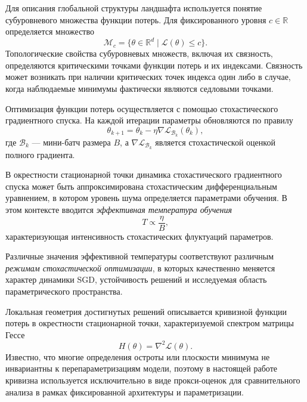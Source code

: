 Для описания глобальной структуры ландшафта используется понятие субуровневого множества функции потерь. 
Для фиксированного уровня $c \in \mathbb{R}$ определяется множество
\begin{equation}
\mathcal{M}_c = \{\theta \in \mathbb{R}^d \mid \mathcal{L}(\theta) \le c\}.
\end{equation}
Топологические свойства субуровневых множеств, включая их связность, определяются критическими точками функции потерь и их индексами. Связность может возникать при наличии критических точек индекса один либо в случае, когда наблюдаемые минимумы фактически являются седловыми точками.

Оптимизация функции потерь осуществляется с помощью стохастического градиентного спуска. 
На каждой итерации параметры обновляются по правилу
\begin{equation}
\theta_{k+1} = \theta_k - \eta \nabla \mathcal{L}_{\mathcal{B}_k}(\theta_k),
\end{equation}
где $\mathcal{B}_k$ — мини-батч размера $B$, а $\nabla \mathcal{L}_{\mathcal{B}_k}$ является стохастической оценкой полного градиента.

В окрестности стационарной точки динамика стохастического градиентного спуска может быть аппроксимирована стохастическим дифференциальным уравнением, в котором уровень шума определяется параметрами обучения. В этом контексте вводится \emph{эффективная температура обучения}
\begin{equation}
T \propto \frac{\eta}{B},
\end{equation}
характеризующая интенсивность стохастических флуктуаций параметров.

Различные значения эффективной температуры соответствуют различным \emph{режимам стохастической оптимизации}, в которых качественно меняется характер динамики SGD, устойчивость решений и исследуемая область параметрического пространства.

Локальная геометрия достигнутых решений описывается кривизной функции потерь в окрестности стационарной точки, характеризуемой спектром матрицы Гессе
\begin{equation}
H(\theta) = \nabla^2 \mathcal{L}(\theta).
\end{equation}
Известно, что многие определения остроты или плоскости минимума не инвариантны к перепараметризациям модели, поэтому в настоящей работе кривизна используется исключительно в виде прокси-оценок для сравнительного анализа в рамках фиксированной архитектуры и параметризации.
